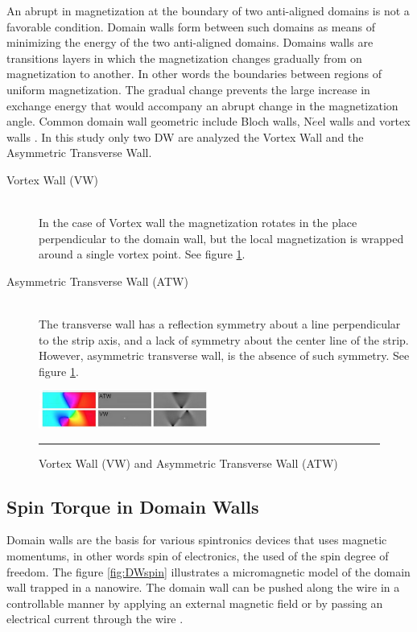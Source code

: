 An abrupt in magnetization at the boundary of two anti-aligned domains is not a favorable condition. Domain walls form between such domains as means of minimizing the energy of the two anti-aligned domains. Domains walls are transitions layers in which the magnetization changes gradually from on magnetization to another. In other words the boundaries between regions of uniform magnetization. The gradual change prevents the large increase in exchange energy that would accompany an abrupt change in the magnetization angle. Common domain wall geometric include Bloch walls, N$\acute{e}$el walls and vortex walls \cite{spindomain}. In this study only two DW are analyzed the Vortex Wall and the Asymmetric Transverse Wall.

\begin{description}
  \item[Vortex Wall (VW)] \hfill \\
   In the case of Vortex wall the magnetization rotates in the place perpendicular to the domain wall, but the local magnetization is wrapped around a single vortex point. See figure \ref{fig:dw}.
   
 \item[Asymmetric Transverse Wall (ATW)] \hfill \\
 The transverse wall has a reflection symmetry about a line perpendicular to the strip axis, and a lack of symmetry about the center line of the strip. However, asymmetric transverse wall, is the absence of such symmetry. See figure \ref{fig:dw}.
 
\end{description}

\begin{figure}[htbp]
	\centering
		\includegraphics[width=0.5\textwidth]{Figures/dw.png}
		\rule{35em}{0.5pt}
	\caption[Domain Wall VW, ATW]{Vortex Wall (VW) and Asymmetric Transverse Wall (ATW)}
	\label{fig:dw}
\end{figure}

\subsection{Spin Torque in Domain Walls}

Domain walls are the basis for various spintronics devices that uses magnetic momentums, in other words spin of electronics, the used of the spin degree of freedom. The figure \ref{fig:DWspin} illustrates a micromagnetic model of the domain wall trapped in a nanowire. The domain wall can be pushed along the wire in a controllable manner by applying an external magnetic field or by passing an electrical current through the wire \cite{dwwire}.


